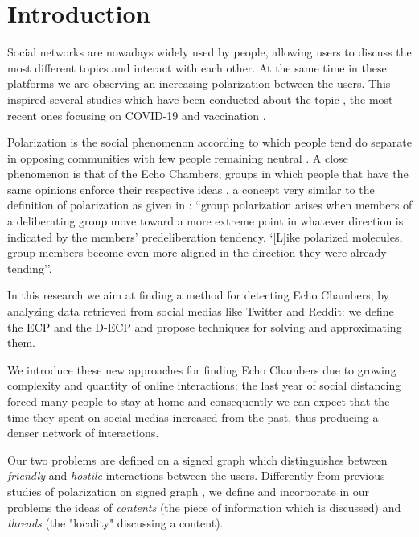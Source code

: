\chapter{Introduction}
\label{ch:introduction}

Social networks are nowadays widely used by people, allowing users to
discuss the most different topics and interact with each other. At the same time in these
platforms we are observing an increasing polarization between the users.
This inspired several studies which have been conducted about the topic
\cite{Garimella2018,Guerra2013,conover2011political,gruzd2014investigating},
the most recent ones focusing on COVID-19
\cite{Jiang2021,green2020elusive,jiang2020political,lang2021maskon}
and vaccination \cite{Cossard2020}.

Polarization is the social phenomenon according to which people tend do
separate in opposing communities with few people remaining neutral
\cite{Guerra2013}. A close phenomenon is that of the Echo Chambers, groups in
which people that have the same opinions enforce their respective ideas
\cite{Garimella2018}, a concept very similar to the definition of polarization
as given in \cite{sunstein1999law}: ``group polarization arises when members of
a deliberating group move toward a more extreme point in whatever direction is
indicated by the members' predeliberation  tendency. `[L]ike polarized
molecules, group members become even more aligned in the direction they were
already tending''\cite{turner1987rediscovering}.

In this research we aim at finding a method for detecting Echo Chambers, by
analyzing data retrieved from social medias like Twitter and Reddit: we define
the \acrfull{ECP} and the \acrfull{D-ECP} and propose techniques for solving
and approximating them.

We introduce these new approaches for finding Echo Chambers due to growing complexity and quantity of
online interactions; the last year of social distancing forced
many people to stay at home and consequently we can expect that the time
they spent on social medias increased from the past, thus producing a denser
network of interactions.

Our two problems are defined on a signed graph which distinguishes
between \emph{friendly} and \emph{hostile} interactions between the users.
Differently from previous studies of polarization on signed graph
\cite{xiao2020searching}, we define
and incorporate in our problems the ideas of \emph{contents} (the piece of
information which is discussed) and \emph{threads} (the "locality"
discussing a content).

